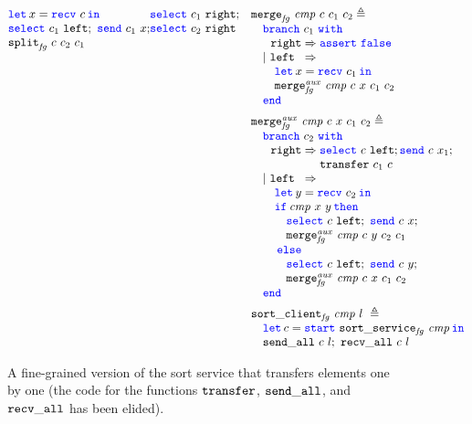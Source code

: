 {\begin{figure}
\begin{equation*}
\begin{array}{@{}l@{\quad}l@{}}
\begin{array}[t]{@{}l@{}}
{\begin{array}[t]{@{}l@{}}
     \Let \var = \recv \chan in \\
     \select {\chan_1} \leftname;\ \send {\chan_1} \var;\\
     \listsortelemservicesplitname\ \chan\ \chan_2\ \chan_1
   \end{array}}
  {\begin{array}[t]{@{}l@{}}
     \select {\chan_1} \rightname;\\ \select {\chan_2} \rightname
   \end{array}}
\end{array}
&
\begin{array}[t]{@{} l @{}}
\listsortelemservicemergename\ \cmpvar\ \chan\ \chan_1\ \chan_2 \eqdef\\
  \quad \mbranchD {\chan_1}
     {\begin{array}[t]{@{}l@{}}
        \Let \var = \recv {\chan_1} in \\
        \listsortelemservicemergerecname\ \cmpvar\ \chan\ \var\ \chan_1\ \chan_2
      \end{array}}
     {\Assert\ \False} \\
~ \\[-0.7em]
\listsortelemservicemergerecname\ \cmpvar\ \chan\ \var\ \chan_1\ \chan_2 \eqdef\\
\quad \mbranchD {\chan_2}
  {\begin{array}[t]{@{}l@{}}
     \Let \varB = \recv{\chan_2} in \\
     \If {\cmpvar\ \var\ \varB} then \\
       \quad \select \chan \leftname;\ \send \chan \var; \\
       \quad \listsortelemservicemergerecname\ \cmpvar\ \chan\ \varB\ \chan_2\ \chan_1 \\
     \Else \\
       \quad \select \chan \leftname;\ \send \chan \varB; \\
       \quad \listsortelemservicemergerecname\ \cmpvar\ \chan\ \var\ \chan_1\ \chan_2
   \end{array}}
  {\begin{array}[t]{@{}l@{}}
     \select{\chan}{\leftname}; \send{\chan}{\var_1}; \\
     \listsortelemservicetransfername\ \chan_1\ \chan
   \end{array}} \\
~ \\[-0.7em]
\listsortelemclientname\ \cmpvar\ l\ \eqdef\\
  \quad \Let \chan = \start{\listsortelemservicename\ \cmpvar} in\\
  \quad \sendallname\ \chan\ l;\
  \recvallname\ \chan\ l
\end{array}
\end{array}
\end{equation*}
\caption{A fine-grained version of the sort service that transfers elements one
by one (the code for the functions $\mathtt{transfer}$,
$\mathtt{send\_all}$, and $\mathtt{recv\_all}$ has been elided).}
\label{fig:dependent}
\end{figure}
}

